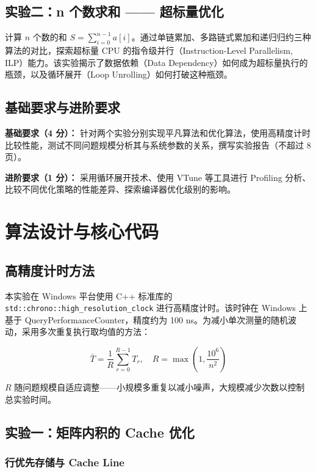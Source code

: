 \documentclass[a4paper]{article}
\begin{document}
\subsection{实验二：n 个数求和 —— 超标量优化}

计算 $n$ 个数的和 $S = \sum_{i=0}^{n-1} a[i]$。通过单链累加、多路链式累加和递归归约三种算法的对比，探索超标量 CPU 的指令级并行（Instruction-Level Parallelism, ILP）能力。该实验揭示了数据依赖（Data Dependency）如何成为超标量执行的瓶颈，以及循环展开（Loop Unrolling）如何打破这种瓶颈。

\subsection{基础要求与进阶要求}

\textbf{基础要求（4 分）：} 针对两个实验分别实现平凡算法和优化算法，使用高精度计时比较性能，测试不同问题规模分析其与系统参数的关系，撰写实验报告（不超过 8 页）。

\textbf{进阶要求（1 分）：} 采用循环展开技术、使用 VTune 等工具进行 Profiling 分析、比较不同优化策略的性能差异、探索编译器优化级别的影响。

\section{算法设计与核心代码}

\subsection{高精度计时方法}

本实验在 Windows 平台使用 C++ 标准库的 \texttt{std::chrono::high\_resolution\_clock} 进行高精度计时。该时钟在 Windows 上基于 QueryPerformanceCounter，精度约为 100 ns。为减小单次测量的随机波动，采用多次重复执行取均值的方法：

\begin{equation}
\bar{T} = \frac{1}{R} \sum_{r=0}^{R-1} T_r, \quad R = \max\left(1, \frac{10^6}{n^2}\right)
\end{equation}

$R$ 随问题规模自适应调整——小规模多重复以减小噪声，大规模减少次数以控制总实验时间。

\subsection{实验一：矩阵内积的 Cache 优化}

\subsubsection{行优先存储与 Cache Line}
\end{document}
